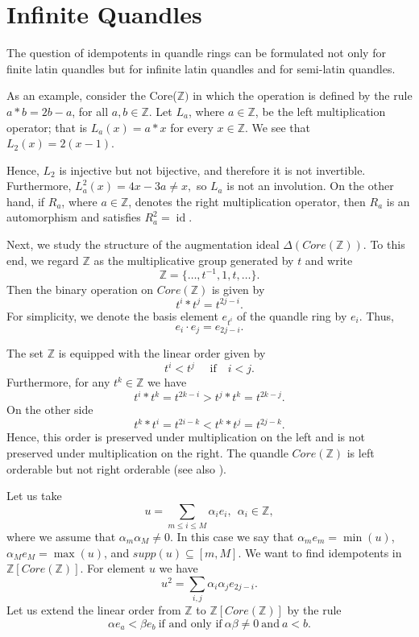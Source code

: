 \documentclass[12pt]{amsart}
\theoremstyle{definition}
\theoremstyle{remark}
\begin{document}
\section{Infinite  Quandles} \label{infinitequandles}

The question of idempotents in quandle rings can be formulated not only for finite latin quandles but for infinite latin quandles and for semi-latin quandles.

As an example, consider the Core($\mathbb{Z})$ in which the operation is defined by the rule $a * b = 2 b - a$, for all $a, b \in \mathbb{Z}$. Let $L_a$, where $a \in \mathbb{Z}$, be the left multiplication operator; that is $L_a(x) = a * x$ for every $x \in \mathbb{Z}$. We see that $L_2 (x) = 2(x - 1)$. 


Hence, $L_2$ is injective but not bijective, and therefore it is not invertible. Furthermore, $L_a^2(x)=4x-3a\neq x,$
so $L_a$ is not an involution. On the other hand, if $R_a$, where $a\in\mathbb{Z}$, denotes the right multiplication operator, then $R_a$ is an automorphism and satisfies $R_a^2=\operatorname{id}$.


Next, we study the structure of the augmentation ideal $\Delta(Core(\mathbb{Z}))$. To this end, we regard $\mathbb{Z}$ as the multiplicative group generated by $t$ and write
\[
\mathbb{Z}=\{\ldots,t^{-1},1,t,\ldots\}.
\]
Then the binary operation on $Core(\mathbb{Z})$ is given by
\[
t^i*t^j=t^{2j-i}.
\]
For simplicity, we denote the basis element $e_{t^i}$ of the quandle ring by $e_i$. Thus,
\[
e_i\cdot e_j=e_{2j-i}.
\]



The set $\mathbb{Z}$ is equipped with the linear order given by
\[
t^i<t^j \quad \text{ if} \quad i<j.
\]
Furthermore, for any $t^k \in \mathbb{Z}$ we have
$$
t^i * t^k = t^{2k-i} > t^j* t^k = t^{2k-j}.
$$
On the other side
$$
t^k * t^i = t^{2i-k} < t^k * t^j = t^{2j-k}.
$$
 Hence, this order is preserved under multiplication on the left and is not preserved under multiplication on the right. %
 The quandle $Core(\mathbb{Z})$ is left orderable but not right orderable  \cite{BPS1} (see also \cite[Propositions 11.3 and 11.5]{BES}).



Let us take
$$
u = \sum_{m \leq i \leq M} \alpha_i e_i,~~\alpha_i  \in \mathbb{Z},
$$
where we assume that  $\alpha_m \alpha_M \not= 0$. In this case we say that $\alpha_m e_m= \min (u)$, $\alpha_M e_M = \max (u)$, and $supp(u) \subseteq [m, M]$.
We want to find idempotents in $\mathbb{Z}[Core(\mathbb{Z})]$. For element $u$ we have 
$$
u^2 = \sum_{i, j} \alpha_i \alpha_j e_{2j-i}.
$$
Let us extend the linear order from $\mathbb{Z}$ to $\mathbb{Z}[Core(\mathbb{Z})]$ by the rule 
$$
\alpha e_a < \beta e_b ~\mbox{if and only if}~\alpha \beta \not= 0~\mbox{and}~a < b.
$$
\end{document}
